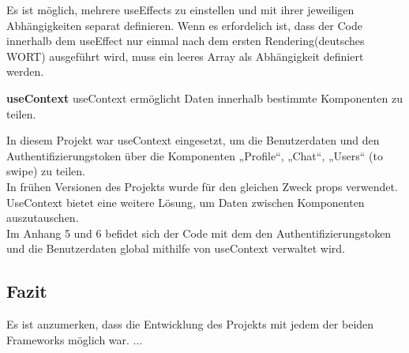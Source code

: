 \begin{flushleft}
  Es ist möglich, mehrere useEffects zu einstellen und mit ihrer jeweiligen Abhängigkeiten separat definieren.
  Wenn es erfordelich ist, dass der Code innerhalb dem useEffect nur einmal nach dem ersten Rendering(deutsches WORT) ausgeführt wird, muss ein leeres Array als Abhängigkeit definiert werden.
\end{flushleft}
  

\textbf{useContext}
useContext ermöglicht Daten innerhalb bestimmte Komponenten zu teilen.

In diesem Projekt war useContext eingesetzt, um die Benutzerdaten und den Authentifizierungstoken über die Komponenten  „Profile“, „Chat“, „Users“ (to swipe) zu teilen.
\\
In frühen Versionen des Projekts wurde für den gleichen Zweck props verwendet.  {\cite{R03}}
UseContext bietet eine weitere Lösung, um Daten zwischen Komponenten auszutauschen.{\cite{R04}}
\\

Im Anhang 5 und 6 befidet sich der Code mit dem den Authentifizierungstoken und die Benutzerdaten global  mithilfe von useContext verwaltet wird.

\subsection{Fazit}
Es ist anzumerken, dass die Entwicklung des Projekts mit jedem der beiden Frameworks möglich war. 
...